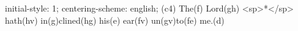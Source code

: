 initial-style: 1;
centering-scheme: english;
(c4) The(f) Lord(gh) <sp>*</sp> hath(hv) in(g)clined(hg) his(e) ear(fv) un(gv)to(fe) me.(d)
